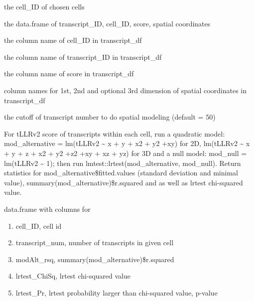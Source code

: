 \documentclass[letterpaper]{book}
\begin{document}
\begin{Arguments}
\begin{ldescription}
\item[\code{chosen\_cells}] the cell\_ID of chosen cells

\item[\code{transcript\_df}] the data.frame of transcript\_ID, cell\_ID, score, spatial coordinates

\item[\code{cellID\_coln}] the column name of cell\_ID in transcript\_df

\item[\code{transID\_coln}] the column name of transcript\_ID in transcript\_df

\item[\code{score\_coln}] the column name of score in transcript\_df

\item[\code{spatLocs\_colns}] column names for 1st, 2nd and optional 3rd dimension of spatial coordinates in transcript\_df

\item[\code{model\_cutoff}] the cutoff of transcript number to do spatial modeling (default = 50)
\end{ldescription}
\end{Arguments}
%
\begin{Details}
For tLLRv2 score of transcripts within each cell,  run a quadratic model: mod\_alternative = lm(tLLRv2 \textasciitilde{} x + y + x2 + y2 +xy) for 2D,  lm(tLLRv2 \textasciitilde{} x + y + z + x2 + y2 +z2 +xy + xz + yz) for 3D and a null model: mod\_null = lm(tLLRv2 \textasciitilde{} 1); then run lmtest::lrtest(mod\_alternative, mod\_null). Return statistics for mod\_alternative\$fitted.values (standard deviation and minimal value), summary(mod\_alternative)\$r.squared and as well as lrtest chi-squared value.
\end{Details}
%
\begin{Value}
data.frame with columns for
\begin{enumerate}

\item{} cell\_ID, cell id
\item{} transcript\_num, number of transcripts in given cell
\item{} modAlt\_rsq, summary(mod\_alternative)\$r.squared
\item{} lrtest\_ChiSq, lrtest chi-squared value
\item{} lrtest\_Pr, lrtest probability larger than chi-squared value, p-value

\end{enumerate}

\end{Value}
\end{document}

